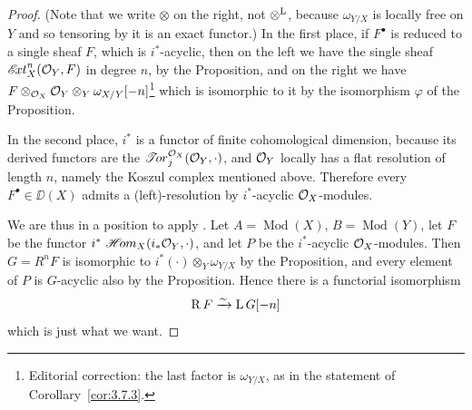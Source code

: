 \begin{proof}
(Note that we write $\otimes$ on the right, not $\mathbin{\otimes^{\mathrm{L}}}$, because $\omega_{Y/X}$ is locally free on $Y$ and so tensoring by it is an exact functor.) In the first place, if $F^\bullet$ is reduced to a single sheaf $F$, which is $i^*$-acyclic, then on the left we have the single sheaf $\mathop{\mathscr{E}\!xt}\nolimits_X^n(\mathcal{O}_Y,F)$ in degree $n$, by the Proposition, and on the right we have $F\otimes_{\mathcal{O}_X}\mathcal{O}_Y\otimes_Y\omega_{X/Y}[-n]$\footnote{Editorial correction: the last factor is $\omega_{Y/X}$, as in the statement of Corollary~\ref{cor:3.7.3}.} which is isomorphic to it by the isomorphism $\varphi$ of the Proposition.

In the second place, $i^*$ is a functor of finite cohomological dimension, because its derived functors are the $\mathop{\mathscr{T}\!or}\nolimits_j^{\mathcal{O}_X}(\mathcal{O}_Y,\cdot)$, and $\mathcal{O}_Y$ locally has a flat resolution of length $n$, namely the Koszul complex mentioned above. Therefore every $F^\bullet\in\DD(X)$ admits a (left)-resolution by $i^*$-acyclic $\mathcal{O}_X$-modules.

We are thus in a position to apply . Let $A=\operatorname{Mod}(X)$, $B=\operatorname{Mod}(Y)$, let $F$ be the functor $i^*\,\mathop{\mathscr{H}\!om}\nolimits_X(i_*\mathcal{O}_Y,\cdot)$, and let $P$ be the $i^*$-acyclic $\mathcal{O}_X$-modules. Then $G=R^nF$ is isomorphic to $i^*(\cdot)\otimes_Y\omega_{Y/X}$ by the Proposition, and every element of $P$ is $G$-acyclic also by the Proposition. Hence there is a functorial isomorphism
\[
\operatorname{R} F \xrightarrow{\sim} \operatorname{L} G[-n]
\]
which is just what we want.
\end{proof}

